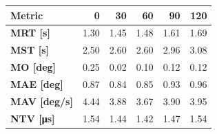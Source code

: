 \begin{tabular*}{\textwidth}{@{\extracolsep{\fill}}l|rrrrr}
    \toprule
    \textbf{Metric} & \textbf{0} & \textbf{30} & \textbf{60} & \textbf{90} & \textbf{120} \\
    \midrule
    \textbf{MRT [s]} & 1.30 & 1.45 & 1.48 & 1.61 & 1.69 \\
    \textbf{MST [s]} & 2.50 & 2.60 & 2.60 & 2.96 & 3.08 \\
    \textbf{MO  [deg]} & 0.25 & 0.02 & 0.10 & 0.12 & 0.12 \\
    \textbf{MAE [deg]} & 0.87 & 0.84 & 0.85 & 0.93 & 0.96 \\
    \textbf{MAV [deg/s]} & 4.44 & 3.88 & 3.67 & 3.90 & 3.95 \\
    \textbf{NTV [\si{\micro\second}]} & 1.54 & 1.44 & 1.42 & 1.47 & 1.54 \\
    \bottomrule
\end{tabular*}

